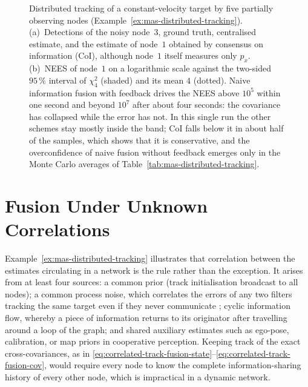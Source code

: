 \begin{figure}[!t]
{
}
\caption{Distributed tracking of a constant-velocity target by five partially observing nodes (Example~\ref{ex:mas-distributed-tracking}). (a)~Detections of the noisy node~$3$, ground truth, centralised estimate, and the estimate of node~$1$ obtained by consensus on information (CoI), although node~$1$ itself measures only $p_x$. (b)~NEES of node~$1$ on a logarithmic scale against the two-sided $95\,\%$ interval of $\chi^{2}_{4}$ (shaded) and its mean $4$ (dotted). Naive information fusion with feedback drives the NEES above $10^{5}$ within one second and beyond $10^{7}$ after about four seconds: the covariance has collapsed while the error has not. In this single run the other schemes stay mostly inside the band; CoI falls below it in about half of the samples, which shows that it is conservative, and the overconfidence of naive fusion without feedback emerges only in the Monte Carlo averages of Table~\ref{tab:mas-distributed-tracking}.}
\label{fig:mas-distributed-tracking}
\end{figure}

\section{Fusion Under Unknown Correlations}
\label{sec:mas-unknown-corr}

Example~\ref{ex:mas-distributed-tracking} illustrates that correlation between the estimates circulating in a network is the rule rather than the exception. It arises from at least four sources: a common prior (track initialisation broadcast to all nodes); a common process noise, which correlates the errors of any two filters tracking the same target even if they never communicate \cite{barshalom2011tracking}; cyclic information flow, whereby a piece of information returns to its originator after travelling around a loop of the graph; and shared auxiliary estimates such as ego-pose, calibration, or map priors in cooperative perception. Keeping track of the exact cross-covariances, as in \eqref{eq:correlated-track-fusion-state}--\eqref{eq:correlated-track-fusion-cov}, would require every node to know the complete information-sharing history of every other node, which is impractical in a dynamic network.

